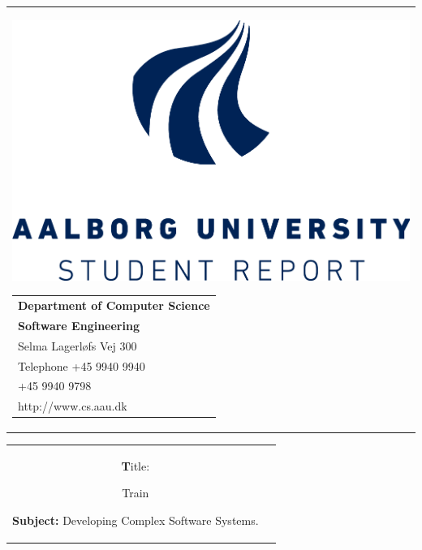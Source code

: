 \begin{titlingpage}
\begin{nopagebreak}
{\samepage 
\begin{tabular}{r}
\parbox{\textwidth}{ {\includegraphics[scale=0.15]{img/titelblad/logo.png}}
\hfill \parbox{4.9cm}{\begin{tabular}{l}
{\textsf{\small \textbf{Department of Computer Science}}}\\
{\textsf{\small  \textbf{Software Engineering}}} \\
{\textsf{\small Selma Lagerløfs Vej 300}} \\
{\textsf{\small Telephone +45 9940 9940}} \\
{\textsf{\small +45 9940 9798}} \\
{\textsf{\small http://www.cs.aau.dk}}
\end{tabular}}}
\\
\end{tabular}

\begin{tabular}{cc}
\parbox{6cm}{
\begin{description}

\item {\textbf Title:} 

Train
  
\item {\textbf{Subject:}} 
Developing Complex Software Systems.

\end{description}

\parbox{8cm}{

}}
\end{tabular}}
\end{nopagebreak}
\end{titlingpage}
